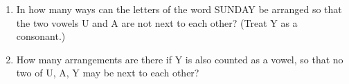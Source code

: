 \begin{enumerate}
\item[(a)] In how many ways can the letters of the word SUNDAY be arranged so that the two vowels U and A are not next to each other? (Treat Y as a consonant.)
\item[(b)] How many arrangements are there if Y is also counted as a vowel, so that no two of U, A, Y may be next to each other?
\end{enumerate}
